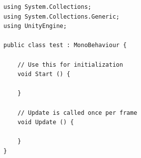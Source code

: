 	\begin{scriptsize}
	\lstset{
		float,
		caption=Aufbau eines Unity Skriptes, 
		language=[Sharp]C, 	
		frame=single,  
		showstringspaces=false, 
		showspaces=false, 
		numbers=left, 
		captionpos=b, 
		belowcaptionskip=4pt,
		basicstyle=\ttfamily
	} 
	\begin{lstlisting}[label=lst:unity3Dc]
using System.Collections;
using System.Collections.Generic;
using UnityEngine;

public class test : MonoBehaviour {

	// Use this for initialization
	void Start () {
		
	}
	
	// Update is called once per frame
	void Update () {
		
	}
}
	\end{lstlisting}
	\end{scriptsize}	